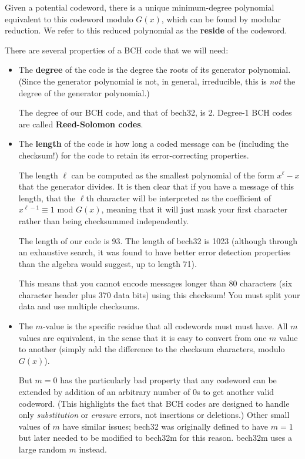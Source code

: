 \documentclass[letterpaper]{article}
\theoremstyle{xxx}
\theoremstyle{evil}
\theoremstyle{yyy}
\theoremstyle{plain}
\theoremstyle{zzz}
\begin{document}
Given a potential codeword, there is a unique minimum-degree polynomial
equivalent to this codeword modulo $G(x)$, which can be found by modular
reduction. We refer to this reduced polynomial as the \textbf{reside}
of the codeword.

There are several properties of a BCH code that we will need:
\begin{itemize}
\item The \textbf{degree} of the code is the degree the roots of its
generator polynomial. (Since the generator polynomial is not, in general, irreducible,
this is \emph{not} the degree of the generator polynomial.)

The degree of our BCH code, and that of bech32, is 2. Degree-1 BCH codes are
called \textbf{Reed-Solomon codes}.

\item The \textbf{length} of the code is how long a coded message can be
(including the checksum!) for the code to retain its error-correcting
properties.

The length $\ell$ can be computed as the smallest polynomial of the form
$x^\ell - x$ that the generator divides. It is then clear that if you have a
message of this length, that the $\ell$th character will be interpreted
as the coefficient of $x^{\ell-1} \equiv 1$ mod $G(x)$, meaning that it
will just mask your first character rather than being checksummed
independently.

The length of our code is 93. The length of bech32 is 1023 (although through
an exhaustive search, it was found to have better error detection properties
than the algebra would suggest, up to length 71).

This means that you cannot encode messages longer than 80 characters (six
character header plus 370 data bits) using this checksum! You must split
your data and use multiple checksums.

\item The $m$-value is the specific residue that all codewords must 
must have. All $m$ values are equivalent, in the sense that it is easy
to convert from one $m$ value to another (simply add the difference to
the checksum characters, modulo $G(x)$).

But $m=0$ has the particularly bad property that any codeword can be extended
by addition of an arbitrary number of 0s to get another valid codeword. (This
highlights the fact that BCH codes are designed to handle only \emph{substitution}
or \emph{erasure} errors, not insertions or deletions.) Other small values of
$m$ have similar issues; bech32 was originally defined to have $m=1$ but later
needed to be modified to bech32m for this reason. bech32m uses a large random
$m$ instead.


\end{itemize}
\end{document}
